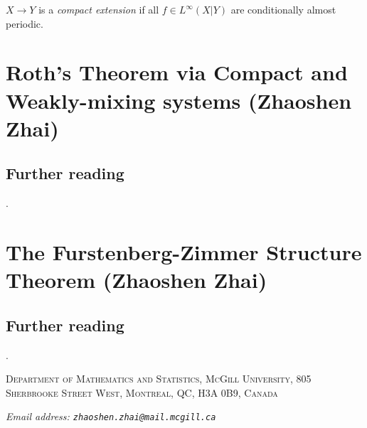 \documentclass[reqno, twoside]{article}
\begin{document}
    \begin{definition}
        $X\to Y$ is a \textit{compact extension} if all $f\in L^\infty(X|Y)$ are conditionally almost periodic.
    \end{definition}

    \section{Roth's Theorem via Compact and Weakly-mixing systems (Zhaoshen Zhai)}\label{sec:8}

    \TODO

    {\vspace{-0.1in}\small\subsection*{Further reading}\TODO.}

    \section{The Furstenberg-Zimmer Structure Theorem (Zhaoshen Zhai)}\label{sec:9}

    \TODO

    {\vspace{-0.1in}\small\subsection*{Further reading}\TODO.}

    \printbibliography

    {\footnotesize
        \textsc{Department of Mathematics and Statistics, McGill University, 805 Sherbrooke Street West, Montreal, QC, H3A 0B9, Canada}

        \textit{Email address: \tt{zhaoshen.zhai@mail.mcgill.ca}}
    }
\end{document}
